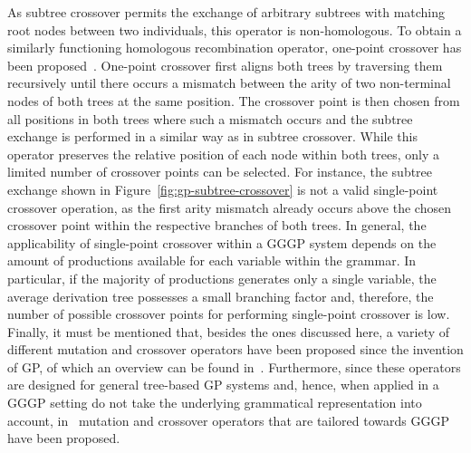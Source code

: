 As subtree crossover permits the exchange of arbitrary subtrees with matching root nodes between two individuals, this operator is non-homologous.
To obtain a similarly functioning homologous recombination operator, one-point crossover has been proposed~\cite{poli1998schema}.
One-point crossover first aligns both trees by traversing them recursively until there occurs a mismatch between the arity of two non-terminal nodes of both trees at the same position.
The crossover point is then chosen from all positions in both trees where such a mismatch occurs and the subtree exchange is performed in a similar way as in subtree crossover.
While this operator preserves the relative position of each node within both trees, only a limited number of crossover points can be selected.
For instance, the subtree exchange shown in Figure~\ref{fig:gp-subtree-crossover} is not a valid single-point crossover operation, as the first arity mismatch already occurs above the chosen crossover point within the respective branches of both trees.
In general, the applicability of single-point crossover within a GGGP system depends on the amount of productions available for each variable within the grammar.
In particular, if the majority of productions generates only a single variable, the average derivation tree possesses a small branching factor and, therefore, the number of possible crossover points for performing single-point crossover is low.
Finally, it must be mentioned that, besides the ones discussed here, a variety of different mutation and crossover operators have been proposed since the invention of GP, of which an overview can be found in~\cite{poli2008field}.
Furthermore, since these operators are designed for general tree-based GP systems and, hence, when applied in a GGGP setting do not take the underlying grammatical representation into account, in~\cite{couchet2007crossover} mutation and crossover operators that are tailored towards GGGP have been proposed. 

